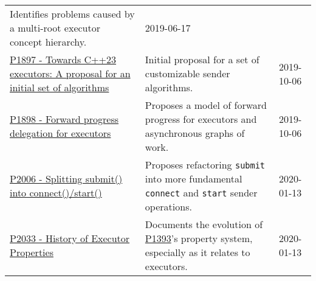 \documentclass[a4paper,12pt,notitlepage,twoside,openright]{article}
\begin{document}
\begin{longtable}[]{@{}lll@{}}
\begin{minipage}[t]{0.54\columnwidth}
Identifies problems caused by a multi-root executor concept
hierarchy.\strut
\end{minipage} & \begin{minipage}[t]{0.05\columnwidth}\raggedright
2019-06-17\strut
\end{minipage}\tabularnewline
\begin{minipage}[t]{0.32\columnwidth}\raggedright
\href{https://wg21.link/P1897}{P1897 - Towards C++23 executors: A
proposal for an initial set of algorithms}\strut
\end{minipage} & \begin{minipage}[t]{0.54\columnwidth}\raggedright
Initial proposal for a set of customizable sender algorithms.\strut
\end{minipage} & \begin{minipage}[t]{0.05\columnwidth}\raggedright
2019-10-06\strut
\end{minipage}\tabularnewline
\begin{minipage}[t]{0.32\columnwidth}\raggedright
\href{https://wg21.link/P1898}{P1898 - Forward progress delegation for
executors}\strut
\end{minipage} & \begin{minipage}[t]{0.54\columnwidth}\raggedright
Proposes a model of forward progress for executors and asynchronous
graphs of work.\strut
\end{minipage} & \begin{minipage}[t]{0.05\columnwidth}\raggedright
2019-10-06\strut
\end{minipage}\tabularnewline
\begin{minipage}[t]{0.32\columnwidth}\raggedright
\href{https://wg21.link/P2006}{P2006 - Splitting submit() into
connect()/start()}\strut
\end{minipage} & \begin{minipage}[t]{0.54\columnwidth}\raggedright
Proposes refactoring \texttt{submit} into more fundamental
\texttt{connect} and \texttt{start} sender
operations.\strut
\end{minipage} & \begin{minipage}[t]{0.05\columnwidth}\raggedright
2020-01-13\strut
\end{minipage}\tabularnewline
\begin{minipage}[t]{0.32\columnwidth}\raggedright
\href{https://wg21.link/P2033}{P2033 - History of Executor
Properties}\strut
\end{minipage} & \begin{minipage}[t]{0.54\columnwidth}\raggedright
Documents the evolution of \href{https://wg21.link/P1393}{P1393}'s
property system, especially as it relates to executors.\strut
\end{minipage} & \begin{minipage}[t]{0.05\columnwidth}\raggedright
2020-01-13\strut
\end{minipage}\tabularnewline
\bottomrule
\end{longtable}
\end{document}
